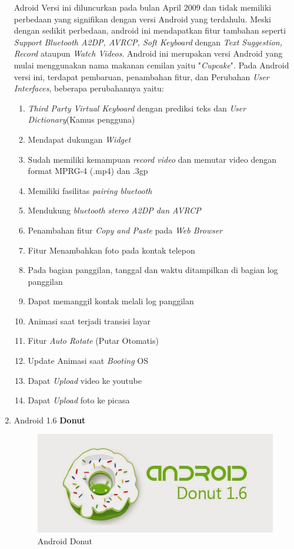 \begin{enumerate}
Adroid Versi ini diluncurkan pada bulan April 2009 dan tidak memiliki perbedaan yang signifikan dengan versi Android yang terdahulu. Meski dengan sedikit perbedaan, android ini mendapatkan fitur tambahan seperti \textit{Support Bluetooth A2DP, AVRCP, Soft Keyboard} dengan \textit{Text Suggestion, Record} ataupun \textit{Watch Videos}. Android ini merupakan versi Android yang mulai menggunakan nama makanan cemilan yaitu "\textit{Cupcake}". Pada Android versi ini, terdapat pembaruan, penambahan fitur, dan Perubahan \textit{User Interfaces}, beberapa perubahannya yaitu:
\begin{enumerate}
    \item \textit{Third Party Virtual Keyboard} dengan prediksi teks dan \textit{User Dictionary}(Kamus pengguna)
    \item Mendapat dukungan \textit{Widget}
    \item Sudah memiliki kemampuan \textit{record video} dan memutar video dengan format MPRG-4 (.mp4) dan .3gp
    \item Memiliki fasilitas \textit{pairing bluetooth}
    \item Mendukung \textit{bluetooth stereo} \textit{A2DP dan AVRCP}
    \item Penambahan fitur \textit{Copy and Paste} pada \textit{Web Browser}
    \item Fitur Menambahkan foto pada kontak telepon
    \item Pada bagian panggilan, tanggal dan waktu ditampilkan di bagian log panggilan
    \item Dapat memanggil kontak melali log panggilan
    \item Animasi saat terjadi transisi layar
    \item Fitur \textit{Auto Rotate} (Putar Otomatis)
    \item Update Animasi saat \textit{Booting} OS 
    \item Dapat \textit{Upload} video ke youtube
    \item Dapat \textit{Upload} foto ke picasa\\
\end{enumerate}


\item Android 1.6 \textbf{Donut}\\
\begin{figure}[!htbp]
    \centering
    \includegraphics[scale=0.5]{pictures/android_donut.jpg}
    \caption{Android Donut}
    \label{}
\end{figure}


\end{enumerate}
